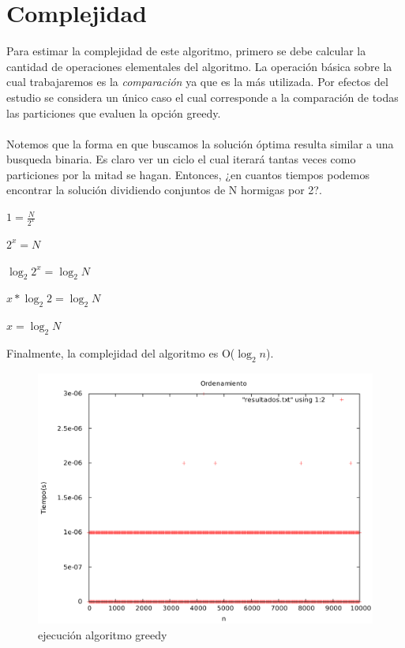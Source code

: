 \documentclass[11pt,spanish]{article}
\begin{document}
\section{Complejidad}
Para estimar la complejidad de este algoritmo, primero se debe calcular 	la cantidad de operaciones elementales del algoritmo. La operación básica sobre la cual trabajaremos es la \emph{comparación} ya que es la más utilizada. Por efectos del estudio se considera un único caso el cual corresponde a la comparación de todas las particiones que evaluen la opción greedy.\\\\Notemos que la forma en que buscamos la solución óptima resulta similar a una busqueda binaria. Es claro ver un ciclo el cual iterará tantas veces como particiones por la mitad se hagan. Entonces, ¿en cuantos tiempos podemos encontrar la solución dividiendo conjuntos de N hormigas por 2?.
\begin{center}$1 = \frac{N}{2^x}$\end{center}
\begin{center}$2^x = N$\end{center}
\begin{center}$\log_2{2^x} = \log_2{N}$\end{center}
\begin{center}$x*\log_2{2} = \log_2{N}$\end{center}
\begin{center}$x = \log_2{N}$\end{center}
Finalmente, la complejidad del algoritmo es O($\log_2{n}$).

\begin{figure}[h]
    \centering
    \includegraphics[scale=0.5]{grafico.pdf}
    \caption{ejecución algoritmo greedy}
    \label{fig:durante}
\end{figure}
\end{document}
